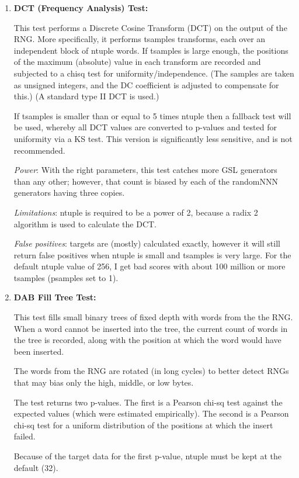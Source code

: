 \documentclass[titlepage, 11pt]{article}
\begin{document}
\begin{enumerate}
\item \textbf{DCT (Frequency Analysis) Test:} 


This test performs a Discrete Cosine Transform (DCT) on the output of
the RNG. More specifically, it performs tsamples transforms, each over
an independent block of ntuple words. If tsamples is large enough, the
positions of the maximum (absolute) value in each transform are
recorded and subjected to a chisq test for uniformity/independence. (The samples are taken as unsigned integers, and the DC coefficient
is adjusted to compensate for this.)
(A standard type II DCT is used.)


If tsamples is smaller than or equal to 5 times ntuple then a fallback
test will be used, whereby all DCT values are converted to p-values
and tested for uniformity via a KS test. This version is significantly
less sensitive, and is not recommended.


\textit{Power}: With the right parameters, this test catches more GSL
generators than any other; however, that count is biased by each of
the randomNNN generators having three copies.


\textit{Limitations}: ntuple is required to be a power of 2, because a radix 2
algorithm is used to calculate the DCT.


\textit{False positives}: targets are (mostly) calculated exactly, however it
will still return false positives when ntuple is small and tsamples is
very large. For the default ntuple value of 256, I get bad scores with
about 100 million or more tsamples (psamples set to 1).


\item \textbf{DAB Fill Tree Test:} 


This test fills small binary trees of fixed depth with
words from the the RNG.  When a word cannot be inserted
into the tree, the current count of words in the tree is
recorded, along with the position at which the word
would have been inserted.


The words from the RNG are rotated (in long cycles) to
better detect RNGs that may bias only the high, middle,
or low bytes.


The test returns two p-values.  The first is a Pearson
chi-sq test against the expected values (which were
estimated empirically).  The second is a Pearson chi-sq
test for a uniform distribution of the positions at
which the insert failed.


Because of the target data for the first p-value,
ntuple must be kept at the default (32).



\end{enumerate}
\end{document}
